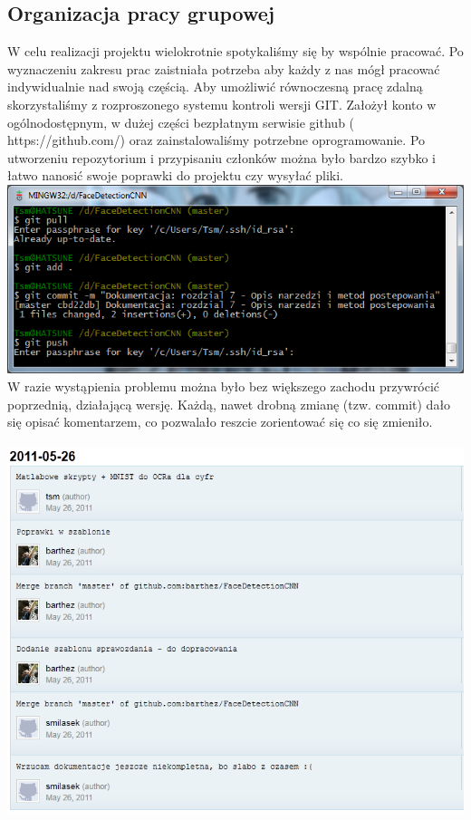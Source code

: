 \documentclass[11pt,a4paper]{article}
\begin{document}
\subsection{Organizacja pracy grupowej}
W celu realizacji projektu wielokrotnie spotykaliśmy się by wspólnie pracować. Po wyznaczeniu zakresu prac zaistniała potrzeba aby każdy z nas mógł pracować indywidualnie nad swoją częścią. Aby umożliwić równoczesną pracę zdalną skorzystaliśmy z rozproszonego systemu kontroli wersji GIT. Założył konto w ogólnodostępnym, w dużej części bezpłatnym serwisie github ( https://github.com/) oraz zainstalowaliśmy potrzebne oprogramowanie. Po utworzeniu repozytorium i przypisaniu członków można było bardzo szybko i łatwo nanosić swoje poprawki do projektu czy wysyłać pliki.\\
\vspace*{0.5cm}
\includegraphics[scale=0.6]{gitconsole}
\vspace*{0.5cm}\\
W razie wystąpienia problemu można było bez większego zachodu przywrócić poprzednią, działającą wersję. Każdą, nawet drobną zmianę (tzw. commit) dało się opisać komentarzem, co pozwalało reszcie zorientować się co się zmieniło.\\
\vspace*{0.5cm}\\
\includegraphics[scale=0.6]{commits}
\vspace*{0.5cm}\\
\end{document}
